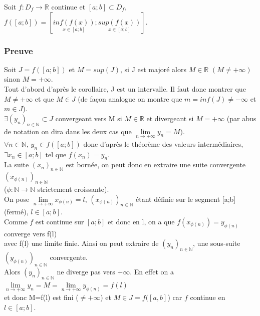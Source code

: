 \documentclass[a4paper,10pt]{book} %
\newcommand{\R}{\mathbb{R}}
\newcommand{\N}{\mathbb{N}}
\newcommand{\tvi}{théorème des valeurs intermédiaires}
\begin{document}
Soit $f:D_{f}\rightarrow \R$ continue et $[a;b]\subset D_{f}$, $f([a;b])=\left[\underset{x\in [a;b]}{inf(f(x))};\underset{x\in [a;b]}{sup(f(x))}\right]$.

\subsubsection{Preuve}
Soit $J=f([a;b])$ et $M=sup(J)$, si J est majoré alors $M\in \R$ $(M\neq +\infty)$ sinon $M=+\infty$.\\

Tout d'abord d'après le corollaire, J est un intervalle. Il faut donc montrer que $M\neq +\infty$ et que $M\in J$ (de façon analogue on montre que $m=inf(J)\neq -\infty$ et $m\in J$).\\

$\exists (y_{n})_{n\in\N}\subset J$ convergeant vers M si $M\in \R$ et divergeant si $M=+\infty$
(par abus de notation on dira dans les deux cas que $\lim\limits_{n\rightarrow +\infty} y_{n}=M)$.\\

$\forall n\in \N$, $y_{n}\in f([a;b])$ donc d'après le \tvi,\\
$\exists x_{n}\in [a;b]$ tel que $f(x_{n})=y_{n}$.\\

La suite $(x_{n})_{n\in \N}$ est bornée, on peut donc en extraire une suite convergente $(x_{\phi(n)})_{n\in\N}$\\
($\phi:\N\rightarrow\N$ strictement croissante).\\

On pose $\lim\limits_{n\rightarrow +\infty} x_{\phi(n)}=l$, $(x_{\phi(n)})_{n\in\N}$ étant définie sur le segment [a;b] (fermé), $l\in [a;b]$.\\

Comme $f$ est continue sur $[a;b]$ et donc en l, on a que $f(x_{\phi(n)})=y_{\phi(n)}$ converge vers f(l)\\
avec f(l) une limite finie. Ainsi on peut extraire de $(y_{n})_{n\in\N}$, une sous-suite $(y_{\phi(n)})_{n\in\N}$ convergente.\\

Alors $(y_{n})_{n\in\N}$ ne diverge pas vers $+\infty$. En effet on a $\lim\limits_{n\rightarrow +\infty} y_{n}=M=\lim\limits_{n\rightarrow +\infty} y_{\phi(n)}=f(l)$\\
et donc M=f(l) est fini ($\neq +\infty$) et $M\in J=f([a,b]$) car $f$ continue en $l\in [a;b]$.\\
\end{document}
